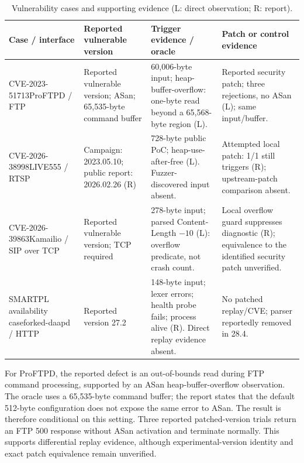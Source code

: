 \begin{table}[!tbp]
\centering\small
\caption{Vulnerability cases and supporting evidence (L: direct observation; R: report).}
\label{tab:cve}
\begin{tabularx}{\textwidth}{@{}>{\raggedright\arraybackslash}p{} >{\raggedright\arraybackslash}p{} Y Y@{}}
\toprule
Case / interface & Reported vulnerable version & Trigger evidence / oracle & Patch or control evidence \\
\midrule
\mbox{CVE-2023-51713}\newline ProFTPD / FTP & Reported vulnerable version; ASan; 65,535-byte command buffer & 60,006-byte input; heap-buffer-overflow: one-byte read beyond a 65,568-byte region (L). & Reported security patch; three rejections, no ASan (L); same input/buffer. \\
\addlinespace[3pt]
\mbox{CVE-2026-38998}\newline LIVE555 / RTSP & Campaign: 2023.05.10; public report: 2026.02.26 (R) & 728-byte public PoC; heap-use-after-free (L). Fuzzer-discovered input absent. & Attempted local patch: 1/1 still triggers (R); upstream-patch comparison absent. \\
\addlinespace[3pt]
\mbox{CVE-2026-39863}\newline Kamailio / SIP over TCP & Reported vulnerable version; TCP required & 278-byte input; parsed Content-Length $-10$ (L): overflow predicate, not crash count. & Local overflow guard suppresses diagnostic (R); equivalence to the identified security patch unverified. \\
\addlinespace[3pt]
SMARTPL availability case\newline forked-daapd / HTTP & Reported version 27.2 & 148-byte input; lexer errors; health probe fails; process alive (R). Direct replay evidence absent. & No patched replay/CVE; parser reportedly removed in 28.4. \\
\bottomrule
\end{tabularx}
\end{table}

For ProFTPD, the reported defect is an out-of-bounds read during FTP command processing, supported by an ASan heap-buffer-overflow observation. The oracle uses a 65,535-byte command buffer; the report states that the default 512-byte configuration does not expose the same error to ASan. The result is therefore conditional on this setting. Three reported patched-version trials return an FTP 500 response without ASan activation and terminate normally. This supports differential replay evidence, although experimental-version identity and exact patch equivalence remain unverified.


